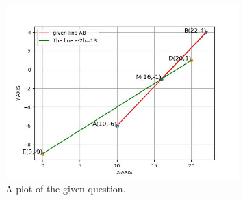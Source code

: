 \documentclass[journal]{IEEEtran}
\begin{document}
			 \begin{figure}[h]
				 \centering
				 \includegraphics[width=0.8\textwidth]{figs/value.jpg}
				 \caption{A plot of the given question.}
				 \label{fig:Plot1}
			 \end{figure}
\end{document}
